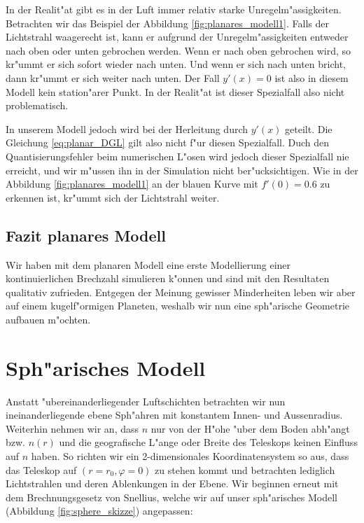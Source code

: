 \begin{refsection}
In der Realit"at gibt es in der Luft immer relativ starke Unregelm"assigkeiten. 
Betrachten wir das Beispiel der Abbildung \ref{fig:planares_modell1}. 
Falls der Lichtstrahl waagerecht ist, kann er aufgrund der Unregelm"assigkeiten entweder nach oben oder unten gebrochen werden. 
Wenn er nach oben gebrochen wird, so kr"ummt er sich sofort wieder nach unten.
Und wenn er sich nach unten bricht, dann kr"ummt er sich weiter nach unten.  
Der Fall $y'(x) = 0$ ist also in diesem Modell kein station"arer Punkt. 
In der Realit"at ist dieser Spezialfall also nicht problematisch. 

In unserem Modell jedoch wird bei der Herleitung durch $y'(x)$ geteilt.
Die Gleichung \ref{eq:planar_DGL} gilt also nicht f"ur diesen Spezialfall. 
Duch den Quantisierungsfehler beim numerischen L"osen wird jedoch dieser Spezialfall nie erreicht, und wir m"ussen ihn in der Simulation nicht ber"ucksichtigen.
Wie in der Abbildung \ref{fig:planares_modell1} an der blauen Kurve mit $f'(0) = 0.6$ zu erkennen ist, kr"ummt sich der Lichtstrahl weiter.

\subsection{Fazit planares Modell}
Wir haben mit dem planaren Modell eine erste Modellierung einer kontinuierlichen Brechzahl simulieren k"onnen und sind mit den Resultaten qualitativ zufrieden. 
Entgegen der Meinung gewisser Minderheiten\cite{licht:flatearthsociety} leben wir aber auf einem kugelf"ormigen Planeten, weshalb wir nun eine sph"arische Geometrie aufbauen m"ochten.

\section{Sph"arisches Modell}

Anstatt "ubereinanderliegender Luftschichten betrachten wir nun ineinanderliegende ebene Sph"ahren mit konstantem Innen- und Aussenradius.
Weiterhin nehmen wir an, dass $n$ nur von der H"ohe "uber dem Boden abh"angt bzw. $n(r)$ und die geografische L"ange oder Breite des Teleskops keinen Einfluss auf $n$ haben.
So richten wir ein 2-dimensionales Koordinatensystem so aus, dass das Teleskop auf $(r = r_0, \varphi=0)$ zu stehen kommt und betrachten lediglich Lichtstrahlen und deren Ablenkungen in der Ebene.
Wir beginnen erneut mit dem Brechnungsgesetz von Snellius, welche wir auf unser sph"arisches Modell (Abbildung \ref{fig:sphere_skizze}) angepassen: 


\end{refsection}
